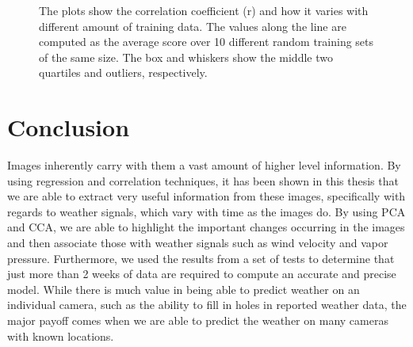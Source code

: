 \begin{figure}
	\centering
	\caption[Analysis of performance of our algorithms with varying training sizes]{The plots show the correlation coefficient (r) and how it varies with different amount of training data. The values along the line are computed as the average score over 10 different random training sets of the same size. The box and whiskers show the middle two quartiles and outliers, respectively.}
	\label{fig:corrcomp}
\end{figure}

\chapter{Conclusion}
\label{cpt:conclusion}
Images inherently carry with them a vast amount of higher level information. By using regression and correlation techniques, it has been shown in this thesis that we are able to extract very useful information from these images, specifically with regards to weather signals, which vary with time as the images do. By using PCA and CCA, we are able to highlight the important changes occurring in the images and then associate those with weather signals such as wind velocity and vapor pressure. Furthermore, we used the results from a set of tests to determine that just more than 2 weeks of data are required to compute an accurate and precise model. While there is much value in being able to predict weather on an individual camera, such as the ability to fill in holes in reported weather data, the major payoff comes when we are able to predict the weather on many cameras with known locations.

